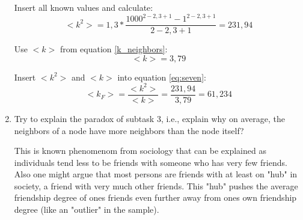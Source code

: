 \begin{enumerate}
	Insert all known values and calculate:
	\begin{equation}
		<k^2> = 1,3 * \frac{1000^{2-2,3+1} - 1^{2-2,3+1}}{2 - 2,3 + 1} = 231,94
	\end{equation}
	
	Use $<k>$ from equation \ref{k_neighbors}:
	\begin{equation}
		<k> = 3,79
	\end{equation}
	
	Insert $<k^2>$ and $<k>$ into equation \ref{eq:seven}:
	\begin{equation}
		<k_F> = \frac{<k^2>}{<k>} = \frac{231,94}{3,79} = 61,234
	\end{equation}
	
	\item Try to explain the paradox of subtask 3, i.e., explain why on average, the neighbors of a node have more neighbors than the node itself?
	
	This is known phenomenom from sociology that can be explained as individuals tend less to be friends with someone who has very few friends. Also one might argue that most persons are friends with at least on "hub" in society, a friend with very much other friends. This "hub" pushes the average friendship degree of ones friends even further away from ones own friendship degree (like an "outlier" in the sample). 
		
\end{enumerate}